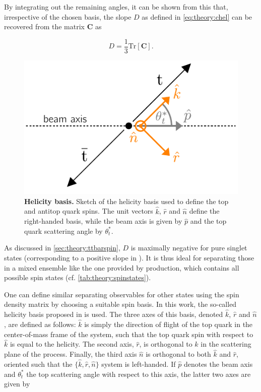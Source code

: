 By integrating out the remaining angles, it can be shown from this that, irrespective of the chosen basis, the slope $D$ as defined in \cref{eq:theory:chel} can be recovered from the matrix $\mathbf{C}$ as~\cite{Bernreuther:2004jv,Bernreuther:2017yhg}

\begin{equation}
    D = \frac{1}{3} \mathrm{Tr} \left[ \mathbf{C} \right] .
\end{equation}

\begin{figure}[t]
  \centering
  \includegraphics[width=0.6\linewidth]{figures/helicity_basis_new.pdf}
  \caption{\textbf{Helicity basis.} Sketch of the helicity basis used to define the top and antitop quark spins. The unit vectors $\hat{k}$, $\hat{r}$ and $\hat{n}$ define the right-handed basis, while the beam axis is given by $\hat{p}$ and the top quark scattering angle by $\theta^*_t$.}
  \label{fig:theory:helicitybasis}
\end{figure}

As discussed in \cref{sec:theory:ttbarspin}, $D$ is maximally negative for pure singlet states (corresponding to a positive slope in \chel). It  is thus ideal for separating those in a mixed ensemble like the one provided by \pptt production, which contains all possible spin states (cf. \cref{tab:theory:spinstates}).

One can define similar separating observables for other states using the spin density matrix by choosing a suitable spin basis. In this work, the so-called helicity basis proposed in  is used. The three axes of this basis, denoted $\hat{k}$, $\hat{r}$ and $\hat{n}$, are defined as follows: $\hat{k}$ is simply the direction of flight of the top quark in the center-of-mass frame of the \ttbar system, such that the top quark spin with respect to $\hat{k}$ is equal to the helicity. The second axis, $\hat{r}$, is orthogonal to $\hat{k}$ in the scattering plane of the \pptt process. Finally, the third axis $\hat{n}$ is orthogonal to both $\hat{k}$ and $\hat{r}$, oriented such that the $\{\hat{k},\hat{r},\hat{n}\}$ system is left-handed. If $\hat{p}$ denotes the beam axis and $\theta^*_t$ the top scattering angle with respect to this axis, the latter two axes are given by

